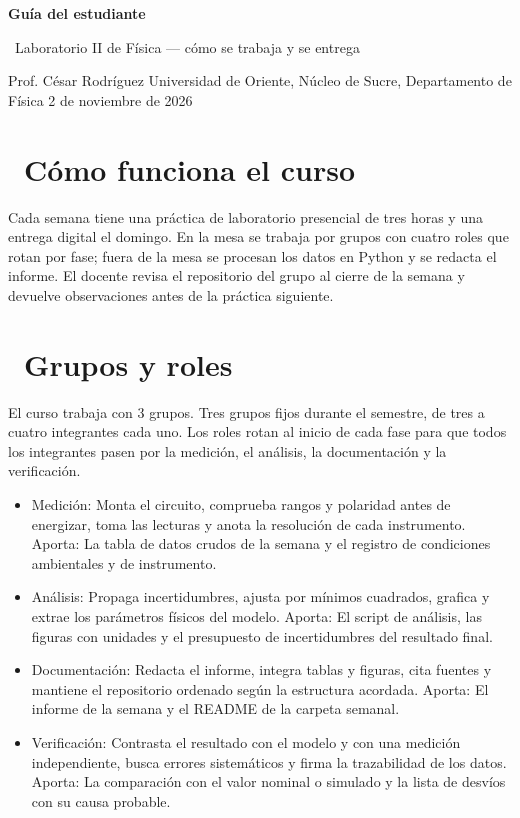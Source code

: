 \documentclass[11pt,a4paper]{article}
\newcommand{\iconoBanda}{microchip}
\newcommand{\bandaTitulo}[3][fondoOscuro]{%
  \begin{tcolorbox}[
    enhanced,
    colback=#1, colframe=#1,
    boxrule=0pt, arc=8pt, outer arc=8pt,
    width=\linewidth,
    top=18pt, bottom=6pt, left=14pt, right=14pt,
    borderline south={3.5pt}{0pt}{cyanNeon},
  ]
    \begin{minipage}[c]{0.07\linewidth}
      \centering
      \textcolor{cyanNeon}{\fontsize{30}{30}\selectfont\faIcon{\iconoBanda}}
    \end{minipage}%
    \hspace{8pt}%
    \begin{minipage}[c]{0.88\linewidth}
      {\fontsize{20}{24}\selectfont\bfseries\color{white}#2}\par\vspace{5pt}%
      \textcolor{cyanNeon!80!white}{\small\faIcon{angle-right}~#3}%
    \end{minipage}
    \vspace{4pt}
  \end{tcolorbox}%
  \vspace{8pt}%
}
\newcommand{\iconotexto}[2]{\textcolor{cyanNeon}{\faIcon{#1}}~#2}
\renewcommand{\iconoBanda}{atom}
\begin{document}
\bandaTitulo[fondoOscuro]{Guía del estudiante}{Laboratorio II de Física --- cómo se trabaja y se entrega}

\begin{center}\small\color{grisTexto}Prof. César Rodríguez \textbar{} Universidad de Oriente, Núcleo de Sucre, Departamento de Física \textbar{} 2 de noviembre de 2026\end{center}

\section{\iconotexto{info-circle}{Cómo funciona el curso}}

Cada semana tiene una práctica de laboratorio presencial de tres horas y una entrega digital el domingo. En la mesa se trabaja por grupos con cuatro roles que rotan por fase; fuera de la mesa se procesan los datos en Python y se redacta el informe. El docente revisa el repositorio del grupo al cierre de la semana y devuelve observaciones antes de la práctica siguiente.

\section{\iconotexto{users}{Grupos y roles}}

El curso trabaja con 3 grupos. Tres grupos fijos durante el semestre, de tres a cuatro integrantes cada uno. Los roles rotan al inicio de cada fase para que todos los integrantes pasen por la medición, el análisis, la documentación y la verificación.

\begin{itemize}[leftmargin=1.4em,itemsep=2pt,topsep=3pt]
  \item Medición: Monta el circuito, comprueba rangos y polaridad antes de energizar, toma las lecturas y anota la resolución de cada instrumento. Aporta: La tabla de datos crudos de la semana y el registro de condiciones ambientales y de instrumento.
  \item Análisis: Propaga incertidumbres, ajusta por mínimos cuadrados, grafica y extrae los parámetros físicos del modelo. Aporta: El script de análisis, las figuras con unidades y el presupuesto de incertidumbres del resultado final.
  \item Documentación: Redacta el informe, integra tablas y figuras, cita fuentes y mantiene el repositorio ordenado según la estructura acordada. Aporta: El informe de la semana y el README de la carpeta semanal.
  \item Verificación: Contrasta el resultado con el modelo y con una medición independiente, busca errores sistemáticos y firma la trazabilidad de los datos. Aporta: La comparación con el valor nominal o simulado y la lista de desvíos con su causa probable.
\end{itemize}
\end{document}
